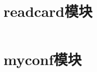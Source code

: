 \inputminted[fontsize=\small,
  linenos=true,numbersep=2pt,
  frame=leftline,framesep=3pt,rulecolor=\color{lightgray},
  xleftmargin=10pt
  ]{python}{../src/ros.py}

\section{readcard模块}

\inputminted[fontsize=\small,
  linenos=true,numbersep=2pt,
  frame=leftline,framesep=3pt,rulecolor=\color{lightgray},
  xleftmargin=10pt
  ]{python}{../src/readcard.py}

\section{myconf模块}

\inputminted[fontsize=\small,
  linenos=true,numbersep=2pt,
  frame=leftline,framesep=3pt,rulecolor=\color{lightgray},
  xleftmargin=10pt
  ]{python}{../src/myconf.py}


